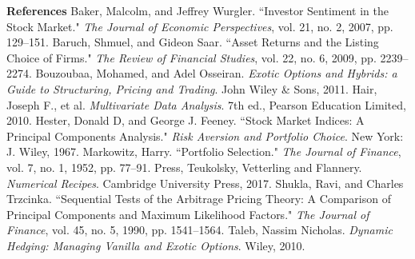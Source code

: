 \documentclass[12pt,twoside]{article}
\begin{document}
{\large \textbf{References}}
\bigbreak
Baker, Malcolm, and Jeffrey Wurgler. ``Investor Sentiment in the Stock Market." \textit{The Journal of Economic Perspectives}, vol. 21, no. 2, 2007, pp. 129–151.
\bigbreak
Baruch, Shmuel, and Gideon Saar. ``Asset Returns and the Listing Choice of Firms." \textit{The Review of Financial Studies}, vol. 22, no. 6, 2009, pp. 2239–2274.
\bigbreak
Bouzoubaa, Mohamed, and Adel Osseiran. \textit{Exotic Options and Hybrids: a Guide to Structuring, Pricing and Trading}. John Wiley \& Sons, 2011.
\bigbreak
Hair, Joseph F., et al. \textit{Multivariate Data Analysis}. 7th ed., Pearson Education Limited, 2010. 
\bigbreak
Hester, Donald D, and George J. Feeney. ``Stock Market Indices: A Principal Components Analysis." \textit{Risk Aversion and Portfolio Choice}. New York: J. Wiley, 1967.
\bigbreak
Markowitz, Harry. ``Portfolio Selection." \textit{The Journal of Finance}, vol. 7, no. 1, 1952, pp. 77–91.
\bigbreak
Press, Teukolsky, Vetterling and Flannery. \textit{Numerical Recipes}. Cambridge University Press, 2017.
\bigbreak
Shukla, Ravi, and Charles Trzcinka. ``Sequential Tests of the Arbitrage Pricing Theory: A Comparison of Principal Components and Maximum Likelihood Factors." \textit{The Journal of Finance}, vol. 45, no. 5, 1990, pp. 1541–1564.
\bigbreak
Taleb, Nassim Nicholas. \textit{Dynamic Hedging: Managing Vanilla and Exotic Options}. Wiley, 2010.
\end{document}

